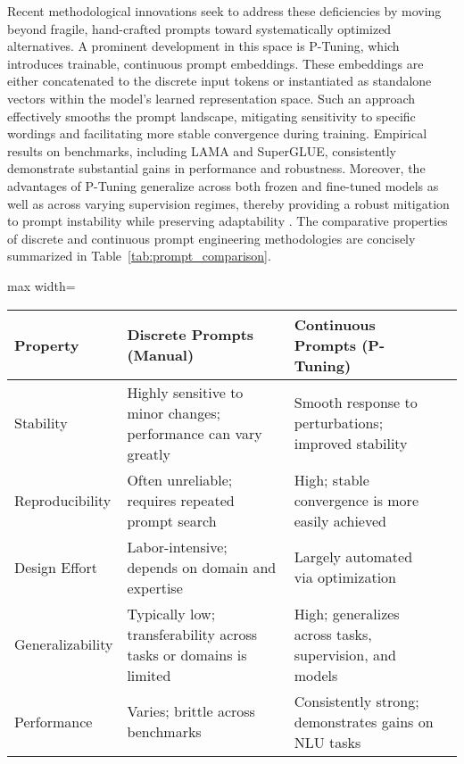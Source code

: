 \documentclass[sigconf]{acmart}
\begin{document}
Recent methodological innovations seek to address these deficiencies by moving beyond fragile, hand-crafted prompts toward systematically optimized alternatives. A prominent development in this space is P-Tuning, which introduces trainable, continuous prompt embeddings. These embeddings are either concatenated to the discrete input tokens or instantiated as standalone vectors within the model’s learned representation space. Such an approach effectively smooths the prompt landscape, mitigating sensitivity to specific wordings and facilitating more stable convergence during training. Empirical results on benchmarks, including LAMA and SuperGLUE, consistently demonstrate substantial gains in performance and robustness. Moreover, the advantages of P-Tuning generalize across both frozen and fine-tuned models as well as across varying supervision regimes, thereby providing a robust mitigation to prompt instability while preserving adaptability \cite{ref103}. The comparative properties of discrete and continuous prompt engineering methodologies are concisely summarized in Table~\ref{tab:prompt_comparison}.

\begin{table*}[htbp]
\centering
\caption{Comparison of Discrete (Manual) and Continuous (P-Tuning) Prompt Engineering Methods}
\label{tab:prompt_comparison}
\begin{adjustbox}{max width=\textwidth}
\begin{tabular}{@{}llll@{}}
\toprule
\textbf{Property} & \textbf{Discrete Prompts (Manual)} & \textbf{Continuous Prompts (P-Tuning)} & \\
\midrule
Stability & Highly sensitive to minor changes; performance can vary greatly & Smooth response to perturbations; improved stability & \\
Reproducibility & Often unreliable; requires repeated prompt search & High; stable convergence is more easily achieved & \\
Design Effort & Labor-intensive; depends on domain and expertise & Largely automated via optimization & \\
Generalizability & Typically low; transferability across tasks or domains is limited & High; generalizes across tasks, supervision, and models & \\
Performance & Varies; brittle across benchmarks & Consistently strong; demonstrates gains on NLU tasks & \\
\bottomrule
\end{tabular}
\end{adjustbox}
\end{table*}
\end{document}
